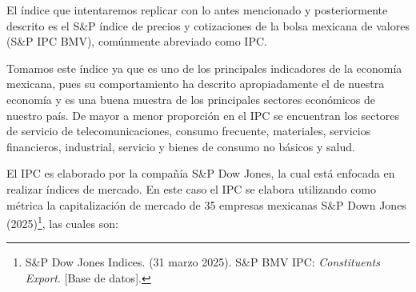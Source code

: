 \documentclass[
]{article}
\begin{document}
El índice que intentaremos replicar con lo antes mencionado y
posteriormente descrito es el S\&P índice de precios y cotizaciones de
la bolsa mexicana de valores (S\&P IPC BMV), comúnmente abreviado como
IPC.

Tomamos este índice ya que es uno de los principales indicadores de la
economía mexicana, pues su comportamiento ha descrito apropiadamente el
de nuestra economía y es una buena muestra de los principales sectores
económicos de nuestro país. De mayor a menor proporción en el IPC se
encuentran los sectores de servicio de telecomunicaciones, consumo
frecuente, materiales, servicios financieros, industrial, servicio y
bienes de consumo no básicos y salud.

El IPC es elaborado por la compañía S\&P Dow Jones, la cual está
enfocada en realizar índices de mercado. En este caso el IPC se elabora
utilizando como métrica la capitalización de mercado de 35 empresas
mexicanas S\&P Down Jones (2025)\footnote{S\&P Dow Jones Indices. (31 marzo 2025). S\&P BMV IPC: \emph{Constituents Export}. {[}Base de datos{]}.}, las cuales
son:
\end{document}
